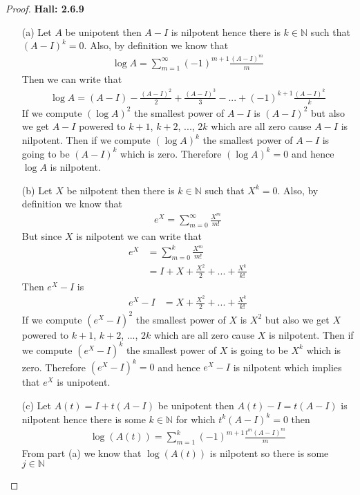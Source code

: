 \documentclass[11pt]{article}
\newcommand{\N}{\mathbb{N}}
\theoremstyle{definition}
\begin{document}
\cleardoublepage
\begin{proof}{\textbf{Hall: 2.6.9}}
\begin{itemize}
\item [(a)] Let $A$ be unipotent then $A - I$ is nilpotent hence there is
$k \in \N$ such that $(A - I)^k = 0$.
Also, by definition we know that
\begin{align*}
    \log A =\sum_{m=1}^\infty (-1)^{m+1}\frac{(A - I)^m}{m}
\end{align*}
Then we can write that
\begin{align*}
    \log A = (A - I) - \frac{(A - I)^2}{2} + \frac{(A - I)^3}{3}
    - ... + (-1)^{k+1}\frac{(A - I)^k}{k}
\end{align*}
If we compute $(\log A)^2$ the smallest power of $A -I$ is $(A - I)^2$ but also
we get $A-I$ powered to $k +1$, $k+2$, ..., $2k$ which are all zero cause $A-I$
is nilpotent. Then if we compute $(\log A)^k$ the smallest power of $A -I$ is
going to be $(A - I)^k$ which is zero. Therefore $(\log A)^k = 0$ and hence
$\log A$ is nilpotent.
\item [(b)] Let $X$ be nilpotent then there is $k \in \N$ such that $X^k = 0$.
Also, by definition we know that
\begin{align*}
    e^X = \sum_{m=0}^\infty \frac{X^m}{m!}
\end{align*}
But since $X$ is nilpotent we can write that
\begin{align*}
    e^X &= \sum_{m=0}^k \frac{X^m}{m!}\\
    &= I + X + \frac{X^2}{2} + ... + \frac{X^k}{k!}
\end{align*}
Then $e^X - I$ is
\begin{align*}
    e^X - I &= X + \frac{X^2}{2} + ... + \frac{X^k}{k!}
\end{align*}
If we compute $(e^X - I)^2$ the smallest power of $X$ is $X^2$ but also
we get $X$ powered to $k +1$, $k+2$, ..., $2k$ which are all zero cause $X$
is nilpotent. Then if we compute $(e^X - I)^k$ the smallest power of $X$ is
going to be $X^k$ which is zero. Therefore $(e^X - I)^k = 0$ and hence
$e^X - I$ is nilpotent which implies that $e^X$ is unipotent.
\cleardoublepage
\item [(c)] Let $A(t) = I + t(A - I)$ be unipotent then $A(t) - I = t(A - I)$
is nilpotent hence there is some $k \in \N$ for which $t^k(A - I)^k = 0$
then
\begin{align*}
    \log(A(t)) = \sum_{m=1}^k (-1)^{m+1}\frac{t^m(A - I)^m}{m}
\end{align*}
From part (a) we know that $\log(A(t))$ is nilpotent so there is some $j \in \N$

\end{itemize}
\end{proof}
\end{document}

